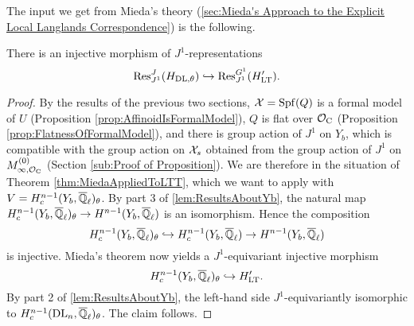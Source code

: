 \documentclass[../main.tex]{subfiles}
\begin{document}
The input we get from Mieda's theory (\cref{sec:Mieda's Approach
to the Explicit Local Langlands Correspondence}) is the
following.
\begin{prop}\label{prop:J1EquivInjMor}
  There is an injective morphism of $J^1$-representations
  \begin{equation*} 
    \mathrm{Res}_{J^1}^J( H_{\mathrm{DL},\theta} ) \hookrightarrow \mathrm{Res}_{J^1}^{G^1}( H'_{\mathrm{LT}}).
  \end{equation*}
  \begin{proof}
    By the results of the previous two sections, $\mathcal{X} = \operatorname{Spf}(Q)$ is a formal
    model of $U$ (Proposition \ref{prop:AffinoidIsFormalModel}), 
    $Q$ is flat over $\mathcal{O}_{\mathrm{C}}$ (Proposition \ref{prop:FlatnessOfFormalModel}),
    and there is group action of $J^1$ on $Y_b$, which is compatible with the group
    action on $\mathcal{X}_s$ obtained from the group action of $J^1$ on $M_{\infty,
    \mathcal{O}_{\mathrm{C}}}^{(0)}$ (Section \ref{sub:Proof of Proposition}).
    We are therefore in the situation of Theorem \ref{thm:MiedaAppliedToLTT}, 
    which we want to apply with $V = H^{n-1}_c(Y_b, {\overline {\mathbb{Q}}_\ell})_\theta$. 
    By part 3 of \cref{lem:ResultsAboutYb}, 
    the natural map $H_c^{n-1}(Y_b, {\overline {\mathbb{Q}}_\ell})_\theta \to H^{n-1}(Y_b,
    {\overline {\mathbb{Q}}_\ell})$ is an isomorphism. Hence the composition
    \begin{equation*}
      H^{n-1}_c(Y_b, {\overline {\mathbb{Q}}_\ell})_\theta \hookrightarrow H^{n-1}_c(Y_b, {\overline {\mathbb{Q}}_\ell})
      \to H^{n-1}(Y_b, {\overline {\mathbb{Q}}_\ell})
    \end{equation*}
    is injective. 
    Mieda's theorem now yields a $J^1$-equivariant injective morphism
    \begin{equation*}
      H_c^{n-1}(Y_b, {\overline {\mathbb{Q}}_\ell})_\theta \hookrightarrow H'_{\mathrm{LT}}.
    \end{equation*}
    By part 2 of \cref{lem:ResultsAboutYb}, the left-hand side
    $J^1$-equivariantly isomorphic to $H_c^{n-1}(\mathrm{DL}_n, {\overline {\mathbb{Q}}_\ell})_\theta$. The
    claim follows.
  \end{proof}
\end{prop}
\end{document}
